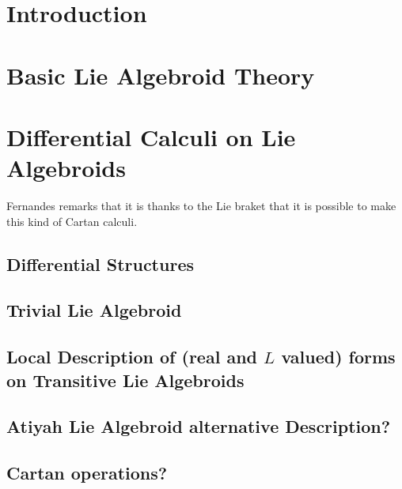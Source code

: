\documentclass[12pt]{report}
\theoremstyle{definition}
\begin{document}
\chapter{Introduction}\label{chp:intro}


\chapter{Basic Lie Algebroid Theory}\label{chp:basicLie}


\chapter{Differential Calculi on Lie Algebroids}\label{chp:diffStruc}


Fernandes remarks that it is thanks to the Lie braket that it is possible to make this kind of Cartan calculi.

\section{Differential Structures}
\section{Trivial Lie Algebroid}
\section{Local Description of (real and $L$ valued) forms on Transitive Lie Algebroids}
\section{Atiyah Lie Algebroid alternative Description?}
\section{Cartan operations?}
\end{document}
